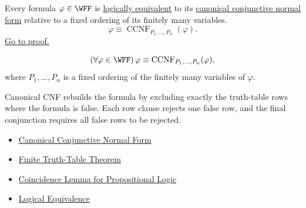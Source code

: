 \begin{tcolorbox}[colback=thmbox, colframe=thmborder, arc=2pt, left=6pt, right=6pt, top=4pt, bottom=4pt, title={\small\textbf{Theorem (Canonical Conjunctive Normal Form)}}]
\begin{theorem}
\label{thm:canonical-conjunctive-normal-form-propositional-logic}
Every formula \(\varphi\in\WFF\) is
\hyperref[def:logical-equivalence-propositional-logic]{logically equivalent}
to its
\hyperref[def:canonical-conjunctive-normal-form-propositional-logic]{canonical conjunctive normal form}
relative to a fixed ordering of its finitely many variables.
\[
\varphi\equiv \operatorname{CCNF}_{P_1,\ldots,P_n}(\varphi).
\]
\noindent\hyperref[prf:canonical-conjunctive-normal-form-propositional-logic]{Go to proof.}
\end{theorem}
\end{tcolorbox}

\begin{remark*}
\[
(\forall\varphi\in\WFF)\,
\varphi\equiv \mathrm{CCNF}_{P_1,\ldots,P_n}(\varphi),
\]
where \(P_1,\ldots,P_n\) is a fixed ordering of the finitely many variables of
\(\varphi\).
\end{remark*}

\begin{remark*}[Interpretation]
Canonical CNF rebuilds the formula by excluding exactly the truth-table rows
where the formula is false. Each row clause rejects one false row, and the
final conjunction requires all false rows to be rejected.
\end{remark*}

\begin{dependencies}
\begin{itemize}
  \item \hyperref[def:canonical-conjunctive-normal-form-propositional-logic]{Canonical Conjunctive Normal Form}
  \item \hyperref[thm:finite-truth-table-propositional-logic]{Finite Truth-Table Theorem}
  \item \hyperref[lem:coincidence-lemma-propositional-logic]{Coincidence Lemma for Propositional Logic}
  \item \hyperref[def:logical-equivalence-propositional-logic]{Logical Equivalence}
\end{itemize}
\end{dependencies}
